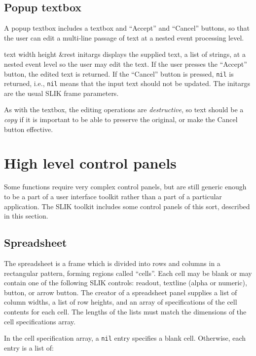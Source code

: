 \documentclass[twoside,openright,11pt]{report}
\newcommand{\tp}[1]{\texttt{#1}}
\begin{document}
\subsection{Popup textbox}
  
A popup textbox includes a textbox and ``Accept'' and ``Cancel''
buttons, so that the user can edit a multi-line passage of text at a
nested event processing level.
  
{text width height \&rest initargs}
{displays the supplied text, a list of strings, at a nested event
level so the user may edit the text.  If the user presses the
``Accept'' button, the edited text is returned.  If the ``Cancel''
button is pressed, \tp{nil} is returned, i.e., \tp{nil} means
that the input text should not be updated.  The initargs are the usual
SLIK frame parameters.}

As with the textbox, the editing operations are \emph{destructive}, so
text should be a \emph{copy} if it is important to be able to preserve
the original, or make the Cancel button effective.

\section{High level control panels}

Some functions require very complex control panels, but are still
generic enough to be a part of a user interface toolkit rather than a
part of a particular application.  The SLIK toolkit includes some
control panels of this sort, described in this section.

\subsection{Spreadsheet}

The spreadsheet is a frame which is divided into
rows and columns in a rectangular pattern, forming regions called
``cells''.  Each cell may be blank or may contain one of the following
SLIK controls: readout, textline (alpha or numeric), button, or arrow
button.  The creator of a spreadsheet panel supplies a list of column
widths, a list of row heights, and an array of specifications of the
cell contents for each cell.  The lengths of the lists must match the
dimensions of the cell specifications array.

In the cell specification array, a \tp{nil} entry specifies a
blank cell.  Otherwise, each entry is a list of:
\end{document}
